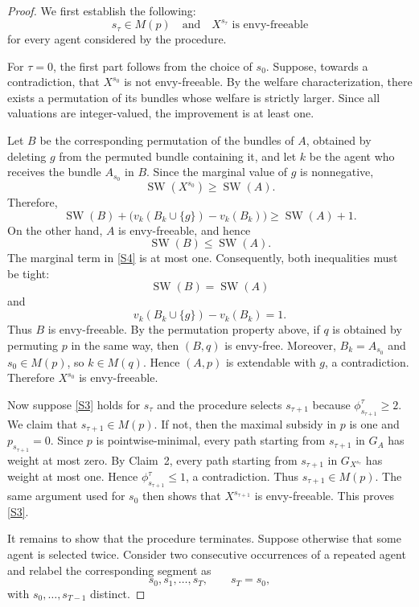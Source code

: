 \documentclass[sigconf,anonymous,nonacm]{aamas}
\begin{document}
\begin{proof}
We first establish the following:
\begin{equation}\label{S3}
    s_\tau\in M(p)
\quad\text{and}\quad
X^{s_\tau}\text{ is envy-freeable}
\end{equation}
for every agent considered by the procedure.

For $\tau=0$, the first part follows from the choice of $s_0$. Suppose, towards a contradiction, that $X^{s_0}$ is not
envy-freeable. By the welfare characterization, there exists a permutation of its bundles whose welfare is strictly larger. Since all valuations are integer-valued, the improvement is at
least one.

Let $B$ be the corresponding permutation of the bundles of $A$, obtained by deleting $g$ from the permuted bundle containing it, and let $k$ be the agent who receives the bundle $A_{s_0}$ in $B$. Since the marginal value of $g$ is nonnegative,
\[
\operatorname{SW}(X^{s_0})\geq\operatorname{SW}(A).
\]
Therefore,
\begin{equation}\label{S4}
\operatorname{SW}(B)
+
\bigl(v_k(B_k\cup\{g\})-v_k(B_k)\bigr)
\geq
\operatorname{SW}(A)+1.
\end{equation}
On the other hand, $A$ is envy-freeable, and hence
\[
\operatorname{SW}(B)\leq\operatorname{SW}(A).
\]
The marginal term in \eqref{S4} is at most one. Consequently, both inequalities must be tight:
\[
\operatorname{SW}(B)=\operatorname{SW}(A)
\]
and
\[
v_k(B_k\cup\{g\})-v_k(B_k)=1.
\]
Thus $B$ is envy-freeable. By the permutation property above, if $q$ is obtained by permuting $p$ in the same way, then $(B,q)$ is envy-free. Moreover, $B_k=A_{s_0}$ and $s_0\in M(p)$, so $k\in M(q)$. Hence $(A,p)$ is extendable with $g$, a contradiction. Therefore $X^{s_0}$ is envy-freeable.

Now suppose \eqref{S3} holds for $s_\tau$ and the procedure selects $s_{\tau+1}$ because $\phi^\tau_{s_{\tau+1}}\geq2$. We claim that $s_{\tau+1}\in M(p)$. If not, then the maximal subsidy in $p$ is one and $p_{s_{\tau+1}}=0$. Since $p$ is pointwise-minimal, every path starting from $s_{\tau+1}$ in $G_A$ has weight at most zero. By Claim~2, every path starting from $s_{\tau+1}$ in $G_{X^{s_\tau}}$ has weight at most one. Hence $\phi^\tau_{s_{\tau+1}}\leq1$, a contradiction. Thus $s_{\tau+1}\in M(p)$. The same argument used for $s_0$ then shows that $X^{s_{\tau+1}}$ is envy-freeable. This proves \eqref{S3}.

It remains to show that the procedure terminates. Suppose otherwise that some agent is selected twice. Consider two consecutive occurrences of a repeated agent and relabel the corresponding segment
as
\[
s_0,s_1,\ldots,s_T,
\qquad
s_T=s_0,
\]
with $s_0,\ldots,s_{T-1}$ distinct.


\end{proof}
\end{document}
